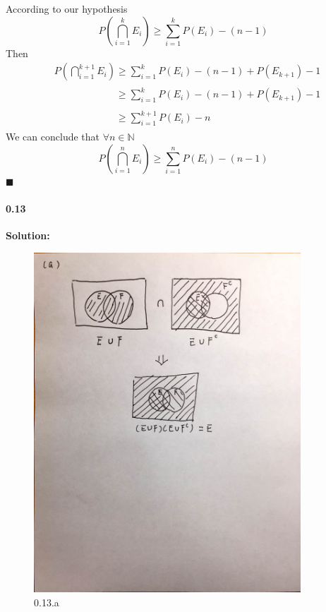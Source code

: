 \documentclass{article}[11pt]
\begin{document}
		 According to our hypothesis
		 \[
		 	P(\bigcap_{i = 1}^k E_i) \geq \sum_{i = 1}^k P(E_i) - (n - 1)\nonumber
		 \]
		 Then
		 \begin{align}
		 	&P(\bigcap_{i = 1}^{k+1} E_i) \geq \sum_{i = 1}^k P(E_i) - (n - 1) + P(E_{k+1}) - 1\nonumber\\
		 	&\phantom{P(\bigcap_{i = 1}^{k+1} E_i)} \geq \sum_{i = 1}^k P(E_i) - (n - 1) + P(E_{k+1}) - 1\nonumber\\
		 	&\phantom{P(\bigcap_{i = 1}^{k+1} E_i)} \geq \sum_{i = 1}^{k + 1} P(E_i) - n\nonumber
		 \end{align}
		 We can conclude that $\forall n \in \mathbb{N}$
		 \[P(\bigcap_{i = 1}^n E_i) \geq \sum_{i = 1}^n P(E_i) - (n - 1)\]
		 $\blacksquare$
	\paragraph{0.13}\textbf{Solution:}
	\begin{figure}[H]
        \begin{center}
        \includegraphics[width=10cm]{./imgs/2-13a.jpg}
        \caption{0.13.a}
        \end{center}
    \end{figure}
\end{document}
